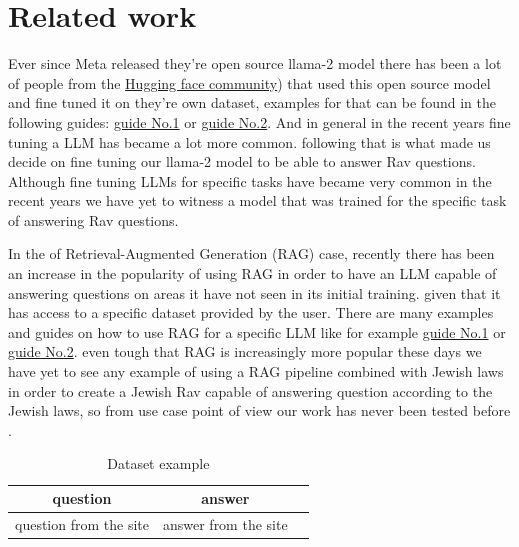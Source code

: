\documentclass[11pt]{article}
\begin{document}
\section{Related work}
Ever since Meta released they're open source llama-2 model there has been a lot of people from the \href{https://huggingface.co/ }{Hugging face community}) that used this open source model and fine tuned it on they're own dataset, examples for that can be found in the following guides:  \href{https://deci.ai/blog/fine-tune-llama-2-with-lora-for-question-answeringo/ }{guide No.1} or \href{https://www.confident-ai.com/blog/the-ultimate-guide-to-fine-tune-llama-2-with-llm-evaluations }{guide No.2}. And in general in the recent years fine tuning a LLM has became a lot more common. following that is what made us decide on fine tuning our llama-2 model to be able to answer Rav questions.
Although fine tuning LLMs for specific tasks have became very common in the recent years we have yet to witness a model that was trained for the specific task of answering Rav questions.

In the of Retrieval-Augmented Generation (RAG) case, recently there has been an increase in the popularity of using RAG in order to have an LLM capable of answering questions on areas it have not seen in its initial training. given that it has access to a specific dataset provided by the user.
There are many examples and guides on how to use RAG for a specific LLM  like for example 
 \href{https://www.kaggle.com/code/gpreda/rag-using-llama-2-langchain-and-chromadb/notebook#Retrieval-Augmented-Generation }{guide No.1}
 or \href{https://blog.demir.io/hands-on-with-rag-step-by-step-guide-to-integrating-retrieval-augmented-generation-in-llms-ac3cb075ab6f }{guide No.2}. even tough that RAG is increasingly more popular these days we have yet to see any example of using a RAG pipeline combined with Jewish laws in order to create a Jewish Rav capable of answering question according to the Jewish laws, so from use case point of view our work has never been tested before .
 

\begin{table}[htbp]
    \centering
    \caption{Dataset example}
    \label{tab:example}
    \begin{tabular}{ccc}
        \toprule
        question & answer   \\
        \midrule
        
        question from the site & answer from the site  \\
        
        \bottomrule
    \end{tabular}
\end{table}
\end{document}
